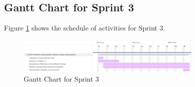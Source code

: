 \subsection{Gantt Chart for Sprint 3}
\label{subsec:gantt_chart_sprint3}
Figure \ref{fig:gantt_chart_sprint3} shows the schedule of activities for Sprint 3.
\begin{figure}[ht]
    \centering
    \includegraphics[width=0.80\textwidth]{./assets/Chapter_3/Gantt/Gantt_Chart_Sprint3.png}
    \caption{Gantt Chart for Sprint 3}
    \label{fig:gantt_chart_sprint3}
\end{figure}
\FloatBarrier